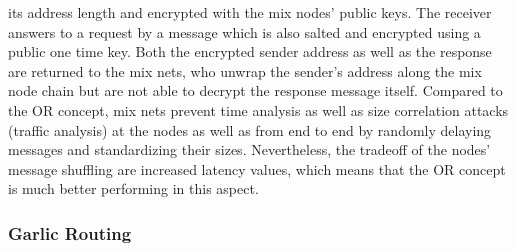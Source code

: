 \documentclass{sig-alternate}
\begin{document}
its address length and encrypted with the mix nodes' public keys. The receiver answers to a request by a message which is also salted and encrypted using a public one time key. Both the encrypted sender address as well as the response are returned to the mix nets, who unwrap the sender's address along the mix node chain but are not able to decrypt the response message itself. Compared to the OR concept, mix nets prevent time analysis as well as size correlation attacks (traffic analysis) at the nodes as well as from end to end by randomly delaying messages and standardizing their sizes. Nevertheless, the tradeoff of the nodes' message shuffling are increased latency values, which means that the OR concept is much better performing in this aspect. 

\subsubsection {Garlic Routing}
\end{document}
